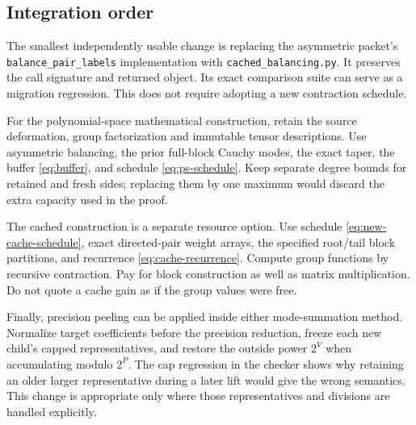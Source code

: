 \subsection{Integration order}

The smallest independently usable change is replacing the asymmetric
packet's \nolinkurl{balance_pair_labels} implementation with
\texttt{cached\_balancing.py}. It preserves the call signature and returned
object. Its exact comparison suite can serve as a migration regression.
This does not require adopting a new contraction schedule.

For the polynomial-space mathematical construction, retain the source
deformation, group factorization and immutable tensor descriptions. Use
asymmetric balancing, the prior full-block Cauchy modes, the exact taper,
the buffer \eqref{eq:buffer}, and schedule \eqref{eq:ps-schedule}.
Keep separate degree bounds for retained and fresh sides; replacing them
by one maximum would discard the extra capacity used in the proof.

The cached construction is a separate resource option. Use schedule
\eqref{eq:new-cache-schedule}, exact directed-pair weight arrays, the
specified root/tail block partitions, and recurrence
\eqref{eq:cache-recurrence}. Compute group functions by recursive
contraction. Pay for block construction as well as matrix multiplication.
Do not quote a cache gain as if the group values were free.

Finally, precision peeling can be applied inside either mode-summation
method. Normalize target coefficients before the precision reduction,
freeze each new child's capped representatives, and restore the outside
power $2^V$ when accumulating modulo $2^P$. The cap regression in the
checker shows why retaining an older larger representative during a later
lift would give the wrong semantics. This change is appropriate only
where those representatives and divisions are handled explicitly.

